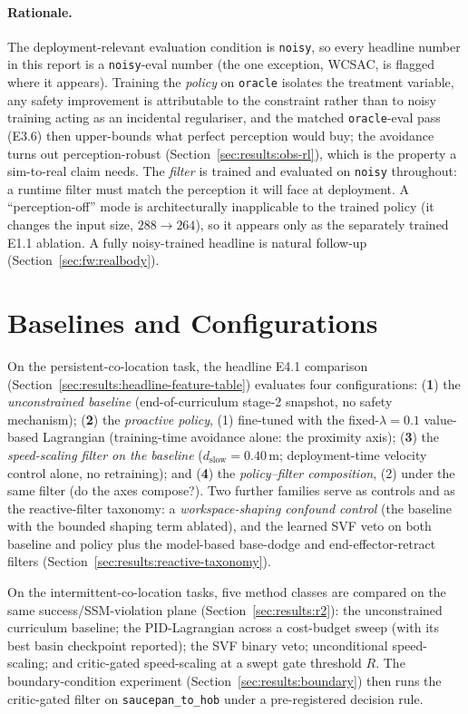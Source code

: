 \documentclass[11pt,a4paper]{report}
\newcommand{\ssm}{SSM}
\begin{document}
\paragraph{Rationale.}
The deployment-relevant evaluation condition is \texttt{noisy}, so
every headline number in this report is a \texttt{noisy}-eval number
(the one exception, WCSAC, is flagged where it appears). Training the
\emph{policy} on \texttt{oracle} isolates the treatment variable, any
safety improvement is attributable to the constraint rather than to
noisy training acting as an incidental regulariser, and the matched
\texttt{oracle}-eval pass (E3.6) then upper-bounds what perfect
perception would buy; the avoidance turns out perception-robust
(Section~\ref{sec:results:obs-rl}), which is the property a
sim-to-real claim needs. The \emph{filter} is trained and evaluated
on \texttt{noisy} throughout: a runtime filter must match the
perception it will face at deployment. A ``perception-off'' mode is
architecturally inapplicable to the trained policy (it changes the
input size, $288 \to 264$), so it appears only as the separately
trained E1.1 ablation. A fully noisy-trained headline is natural
follow-up (Section~\ref{sec:fw:realbody}).

\section{Baselines and Configurations}
\label{sec:setup:baselines}

On the persistent-co-location task, the headline E4.1 comparison
(Section~\ref{sec:results:headline-feature-table}) evaluates four
configurations: (\textbf{1}) the \emph{unconstrained baseline}
(end-of-curriculum stage-2 snapshot, no safety mechanism); (\textbf{2})
the \emph{proactive policy}, (1) fine-tuned with the
fixed-$\lambda = 0.1$ value-based Lagrangian (training-time
avoidance alone: the proximity axis); (\textbf{3}) the
\emph{speed-scaling filter on the baseline}
($d_{\mathrm{slow}} = 0.40$\,m; deployment-time velocity control
alone, no retraining); and (\textbf{4}) the \emph{policy--filter
composition}, (2) under the same filter (do the axes compose?). Two
further families serve as controls and as the reactive-filter
taxonomy: a \emph{workspace-shaping confound control} (the baseline
with the bounded shaping term ablated), and the learned SVF veto on
both baseline and policy plus the model-based base-dodge and
end-effector-retract filters
(Section~\ref{sec:results:reactive-taxonomy}).

On the intermittent-co-location tasks, five method classes are
compared on the same success/\ssm{}-violation plane
(Section~\ref{sec:results:r2}): the unconstrained curriculum
baseline; the PID-Lagrangian across a cost-budget sweep (with its
best basin checkpoint reported); the SVF binary veto; unconditional
speed-scaling; and critic-gated speed-scaling at a swept gate
threshold $R$. The boundary-condition experiment
(Section~\ref{sec:results:boundary}) then runs the critic-gated
filter on \texttt{saucepan\_to\_hob} under a pre-registered decision
rule.
\end{document}
